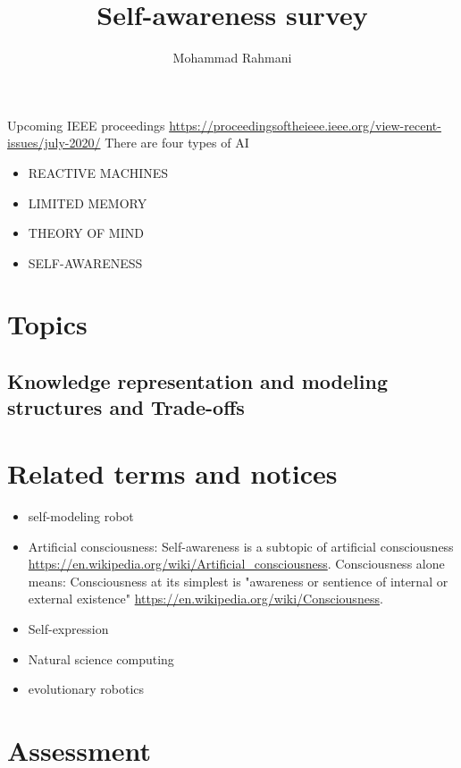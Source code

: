 \documentclass{article}
\begin{document}
	
	\title{Self-awareness survey}
	\author{Mohammad Rahmani}
	\date{}
	\maketitle
	Upcoming IEEE proceedings
	\url{https://proceedingsoftheieee.ieee.org/view-recent-issues/july-2020/}
	There are four types of AI
	\begin{itemize}
		\item  REACTIVE MACHINES
	    \item  LIMITED MEMORY
	    \item  THEORY OF MIND
		\item  SELF-AWARENESS
	\end{itemize}
	\section{Topics}
		\subsection{Knowledge representation and modeling structures and Trade-offs}
		\cite{minku-2016-knowledge-representation-and-modelling-structures-and-trade-offs}
		
	\section{Related terms and notices}
		\begin{itemize}
			\item self-modeling robot \citep{kwiatkowski-2019-task-agnostic-self-modeling-machines}
			\item Artificial consciousness: Self-awareness is a subtopic of artificial consciousness \url{https://en.wikipedia.org/wiki/Artificial_consciousness}. Consciousness alone means: Consciousness at its simplest is "awareness or sentience of internal or external existence" \url{https://en.wikipedia.org/wiki/Consciousness}.
			\item Self-expression \citep{lewis-2011-a-survey-of-self-awareness-and-its-application-in-computing-systems}
			\item Natural science computing
			\item evolutionary robotics
		\end{itemize}
	
	\section{Assessment}
		\citet{herbst-2017-metrics-and-benchmarks-for-self-aware-computing-systems}
		\citet{esterle-2017-assessing-self-awareness}
\end{document}
